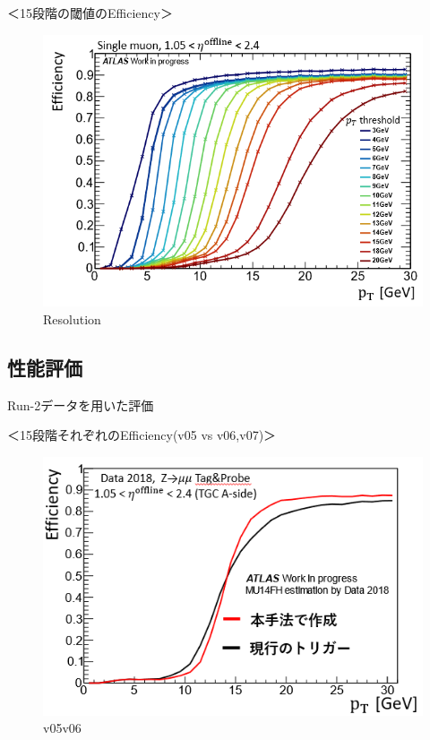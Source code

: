 ＜15段階の閾値のEfficiency＞
\begin{figure}[tb]
  \centering
  \includegraphics[clip, width=14cm]{fig/4/v07_15_Eff.png}
  \caption{Resolution}
  \label{fig:Resolution}
\end{figure}

\subsection{性能評価}
Run-2データを用いた評価

＜15段階それぞれのEfficiency(v05 vs v06,v07)＞\\
\begin{figure}[tb]
  \centering
  \includegraphics[clip, width=14cm]{fig/4/hikaku_v05_v06.png}
  \caption{v05v06}
  \label{fig:Resolution}
\end{figure}

